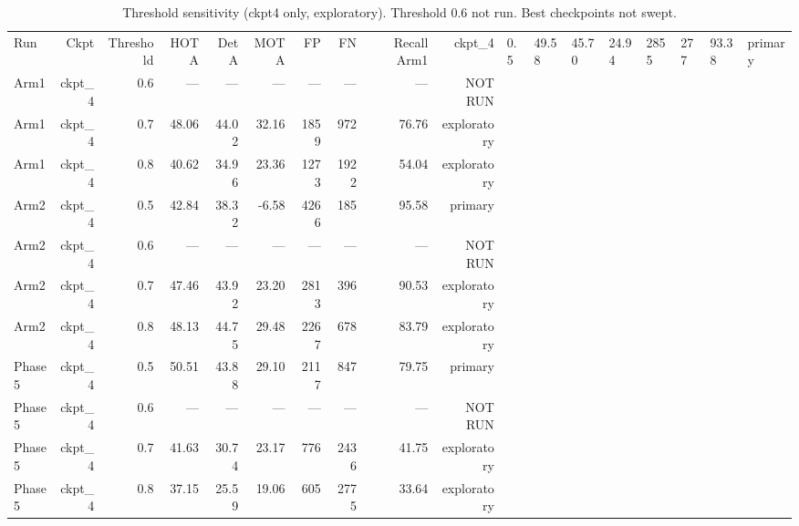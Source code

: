 \begin{table}[ht]
\centering
\caption{Threshold sensitivity (ckpt4 only, exploratory). Threshold 0.6 not run. Best checkpoints not swept.}
\label{tab:threshold}
\begin{tabular}{lrrrrrrrrr}
\toprule
Run & Ckpt & Threshold & HOTA & DetA & MOTA & FP & FN & Recall%
\midrule
Arm1 & ckpt_4 & 0.5 & 49.58 & 45.70 & 24.94 & 2855 & 277 & 93.38 & primary \\
Arm1 & ckpt_4 & 0.6 & — & — & — & — & — & — & NOT RUN \\
Arm1 & ckpt_4 & 0.7 & 48.06 & 44.02 & 32.16 & 1859 & 972 & 76.76 & exploratory \\
Arm1 & ckpt_4 & 0.8 & 40.62 & 34.96 & 23.36 & 1273 & 1922 & 54.04 & exploratory \\
Arm2 & ckpt_4 & 0.5 & 42.84 & 38.32 & -6.58 & 4266 & 185 & 95.58 & primary \\
Arm2 & ckpt_4 & 0.6 & — & — & — & — & — & — & NOT RUN \\
Arm2 & ckpt_4 & 0.7 & 47.46 & 43.92 & 23.20 & 2813 & 396 & 90.53 & exploratory \\
Arm2 & ckpt_4 & 0.8 & 48.13 & 44.75 & 29.48 & 2267 & 678 & 83.79 & exploratory \\
Phase5 & ckpt_4 & 0.5 & 50.51 & 43.88 & 29.10 & 2117 & 847 & 79.75 & primary \\
Phase5 & ckpt_4 & 0.6 & — & — & — & — & — & — & NOT RUN \\
Phase5 & ckpt_4 & 0.7 & 41.63 & 30.74 & 23.17 & 776 & 2436 & 41.75 & exploratory \\
Phase5 & ckpt_4 & 0.8 & 37.15 & 25.59 & 19.06 & 605 & 2775 & 33.64 & exploratory \\
\bottomrule
\end{tabular}
\end{table}
